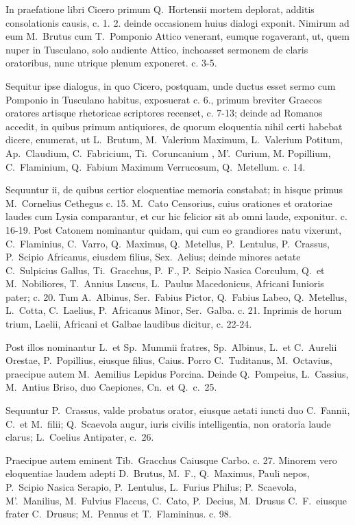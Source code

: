 In praefatione libri Cicero primum Q.~Hortensii mortem deplorat, additis consolationis causis, c. 1. 2. deinde occasionem huius dialogi exponit. Nimirum ad eum M.~Brutus cum T.~Pomponio Attico venerant, eumque rogaverant, ut, quem nuper in Tusculano, solo audiente Attico, inchoasset sermonem de claris oratoribus, nunc utrique plenum exponeret. c. 3-5. 

Sequitur ipse dialogus, in quo Cicero, postquam, unde ductus esset sermo cum Pomponio in Tusculano habitus, exposuerat c. 6., primum breviter Graecos oratores artisque rhetoricae scriptores recenset, c. 7-13; deinde ad Romanos accedit, in quibus primum antiquiores, de quorum eloquentia nihil certi habebat dicere, enumerat, ut L.~Brutum, M.~Valerium Maximum, L.~Valerium Potitum, Ap.~Claudium, C.~Fabricium, Ti.~Coruncanium , M'.~Curium, M. Popillium, C.~Flaminium, Q.~Fabium Maximum Verrucosum, Q.~Metellum. c. 14.


Sequuntur ii, de quibus certior eloquentiae memoria constabat; in hisque primus M.~Cornelius Cethegus c. 15. M.~Cato Censorius, cuius orationes et oratoriae laudes cum Lysia comparantur, et cur hic felicior sit ab omni laude, exponitur. c. 16-19. Post Catonem nominantur quidam, qui cum eo grandiores natu vixerunt, C.~Flaminius, C.~Varro, Q.~Maximus, Q.~Metellus, P.~Lentulus, P.~Crassus, P.~Scipio Africanus, eiusdem filius, Sex.~Aelius; deinde minores aetate C.~Sulpicius Gallus, Ti.~Gracchus, P.~F., P.~Scipio Nasica Corculum, Q.\ et M.\ Nobiliores, T.~Annius Luscus, L.~Paulus Macedonicus, Africani Iunioris pater; c. 20. Tum A.~Albinus, Ser.~Fabius Pictor, Q.~Fabius Labeo, Q.~Metellus, L.~Cotta, C.~Laelius, P.~Africanus Minor, Ser.~Galba. c. 21. Inprimis de horum trium, Laelii, Africani et Galbae laudibus dicitur, c. 22-24.

Post illos nominantur L.\ et Sp.~Mummii fratres, Sp.~Albinus, L.\ et C.~Aurelii Orestae, P.~Popillius, eiusque filius, Caius. Porro C.~Tuditanus, M.~Octavius, praecipue autem M.~Aemilius Lepidus Porcina. Deinde Q.~Pompeius, L.~Cassius, M.~Antius Briso, duo Caepiones, Cn.\ et Q.\ c.\ 25.

Sequuntur P.~Crassus, valde probatus orator, eiusque aetati iuncti duo C.~Fannii, C.\ et M.\ filii; Q.~Scaevola augur, iuris civilis intelligentia, non oratoria laude clarus; L.~Coelius Antipater, c.\ 26. 

Praecipue autem eminent Tib.~Gracchus Caiusque Carbo. c. 27. Minorem vero eloquentiae laudem adepti D.~Brutus, M.\ F., Q.~Maximus, Pauli nepos, P.~Scipio Nasica Serapio, P.~Lentulus, L.~Furius Philus; P.~Scaevola, M'.~Manilius, M.~Fulvius Flaccus, C.~Cato, P.~Decius, M.~Drusus C.~F.\ eiusque frater C.~Drusus; M.~Pennus et T.~Flamininus. c. 98. 

